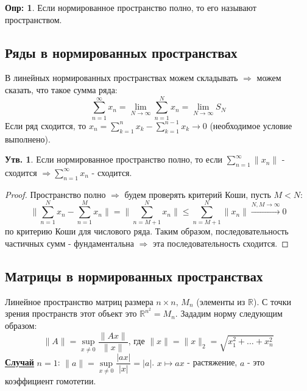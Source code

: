 \documentclass[12pt]{article}
\newcommand{\MR}{\mathbb{R}}
\theoremstyle{definition}
\newtheorem{defn}{Опр:}
\newtheorem{prop}{Утв.}
\begin{document}
\begin{defn}
	Если нормированное пространство полно, то его называют  пространством. 
\end{defn}

\subsection*{Ряды в нормированных пространствах}
В линейных нормированных пространствах можем складывать $\Rightarrow$ можем сказать, что такое сумма ряда: 
$$\displaystyle \sum\limits_{n = 1}^{\infty} x_n = \lim\limits_{N \to \infty} \displaystyle \sum\limits_{n = 1}^{N} x_n =  \lim\limits_{N \to \infty} S_N$$
Если ряд сходится, то $x_n = \displaystyle \sum\limits_{k = 1}^{n} x_k - \sum\limits_{k = 1}^{n-1}x_k \to 0$ (необходимое условие выполнено).

\begin{prop}
	Если нормированное пространство полно, то если $\displaystyle\sum\limits_{n = 1}^{\infty} \|x_n\|$ - сходится $\Rightarrow \displaystyle\sum\limits_{n = 1}^{\infty} x_n$ - сходится.
\end{prop}
\begin{proof}
	Пространство полно $\Rightarrow$ будем проверять критерий Коши, пусть $M < N$:
	$$
		\Bigg\| \sum\limits_{n = 1}^{N} x_n - \sum\limits_{n = 1}^{M}x_n\Bigg\| = \Bigg\|\sum\limits_{n = M+1}^{N} x_n\Bigg\| \leq \sum\limits_{n = M+1}^{N} \|x_n\| \xrightarrow[]{N,M \to \infty} 0
	$$
	по критерию Коши для числового ряда. Таким образом, последовательность частичных сумм - фундаментальна $\Rightarrow$ эта последовательность сходится.
\end{proof}

\subsection*{Матрицы в нормированных пространствах}
Линейное пространство матриц размера $n\times n,\, M_n$ (элементы из $\MR$). С точки зрения пространств этот объект это $\MR^{n^2} = M_n$. Зададим норму следующим образом: 
$$
\|A\| = \sup\limits_{x \neq 0}\dfrac{\|Ax\|}{\|x\|}, \, \text{где } \|x\| = \|x\|_2 = \sqrt{x_1^2 + \dotsc + x_n^2}
$$
\textbf{\uline{Случай}} $n=1$: $\|a\| = \sup\limits_{x\neq 0}\dfrac{|ax|}{|x|} = |a|$. $x \mapsto ax$ - растяжение, $a$ - это коэффициент гомотетии. 
\end{document}
